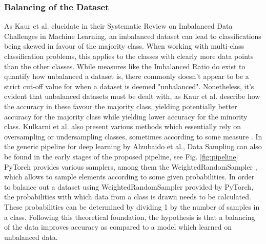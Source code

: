 \subsubsection{Balancing of the Dataset}\label{balancingtheory}
As Kaur et al. \citep{kaurbalancing} elucidate in their Systematic Review on Imbalanced Data Challenges
in Machine Learning, an imbalanced dataset can lead to classifications being skewed in favour of the majority class. When working with multi-class classification problems, this applies to the classes with clearly more data points than the other classes. While measures like the Imbalanced Ratio \citep{kulkarni2020foundations} do exist to quantify how unbalanced a dataset is, there commonly doesn't appear to be a strict cut-off value for when a dataset is deemed "unbalanced". Nonetheless, it's evident that unbalanced datasets must be dealt with, as Kaur et al. describe how the accuracy in these favour the majority class, yielding potentially better accuracy for the majority class while yielding lower accuracy for the minority class. Kulkarni et al. also present various methods which essentially rely on oversampling or undersampling classes, sometimes according to some measure \citep{kulkarni2020foundations}. In the generic pipeline for deep learning by Alzubaido et al., Data Sampling can also be found in the early stages of the proposed pipeline, see Fig. \ref{fig:pipeline} PyTorch provides various samplers, among them the WeightedRandomSampler \citep{pytorchTorchutilsdatax2014}, which allows to sample elements according to some given probabilities. In order to balance out a dataset using WeightedRandomSampler provided by PyTorch, the probabilities with which data from a class is drawn needs to be calculated. These probabilities can be determined by dividing 1 by the number of samples in a class. Following this theoretical foundation, the hypothesis is that a balancing of the data improves accuracy as compared to a model which learned on unbalanced data.


